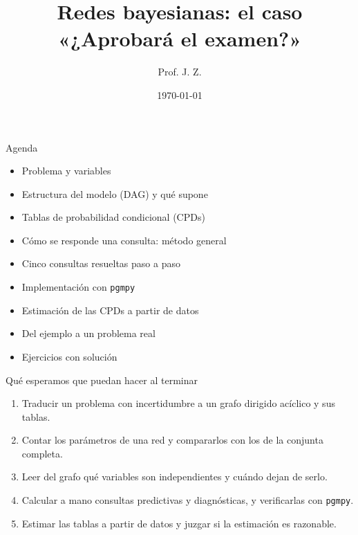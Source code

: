 \documentclass[11pt]{beamer}
\title[¿Aprobará el examen?]{Redes bayesianas: el caso «¿Aprobará el examen?»}
\author[JZ]{Prof. J. Z.}
\institute[Magíster en Estadística]{Magíster en Estadística\\Curso de Machine Learning}
\date{\today}
\begin{document}
\begin{frame}
  \titlepage
\end{frame}

\begin{frame}{Agenda}
  \begin{itemize}
    \item Problema y variables
    \item Estructura del modelo (DAG) y qué supone
    \item Tablas de probabilidad condicional (CPDs)
    \item Cómo se responde una consulta: método general
    \item Cinco consultas resueltas paso a paso
    \item Implementación con \texttt{pgmpy}
    \item Estimación de las CPDs a partir de datos
    \item Del ejemplo a un problema real
    \item Ejercicios con solución
  \end{itemize}
\end{frame}

\begin{frame}{Qué esperamos que puedan hacer al terminar}
  \begin{enumerate}
    \item Traducir un problema con incertidumbre a un grafo dirigido acíclico y sus tablas.
    \item Contar los parámetros de una red y compararlos con los de la conjunta completa.
    \item Leer del grafo qué variables son independientes y cuándo dejan de serlo.
    \item Calcular a mano consultas predictivas y diagnósticas, y verificarlas con \texttt{pgmpy}.
    \item Estimar las tablas a partir de datos y juzgar si la estimación es razonable.
  \end{enumerate}
\end{frame}
\end{document}
